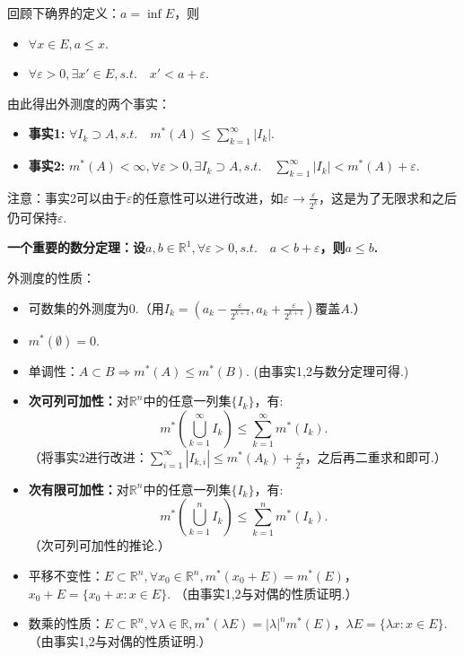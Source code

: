 \documentclass[bwprint, withoutpreface]{cumcmthesis}
\begin{document}
回顾下确界的定义：$a = \inf E$，则
\begin{itemize}[itemindent=2em]
	\item $\forall x \in E, a \leqslant x$.
	\item $\forall \varepsilon > 0, \exists x' \in E, s.t. \quad x' < a + \varepsilon$.
\end{itemize}

由此得出外测度的两个事实：
\begin{itemize}[itemindent=2em]
	\item \textbf{事实1:} $\forall {I_k} \supset A, s.t. \quad m^*(A) \leqslant \sum_{k = 1}^{\infty}|I_k|$.
	\item \textbf{事实2:} $m^*(A) < \infty, \forall \varepsilon > 0, \exists {I_k} \supset A, s.t. \quad \sum_{k = 1}^{\infty}|I_k| < m^*(A) + \varepsilon$.
\end{itemize}

注意：事实2可以由于$\varepsilon$的任意性可以进行改进，如$\varepsilon \to \frac{\varepsilon}{2^k}$，这是为了无限求和之后仍可保持$\varepsilon$.

\textbf{一个重要的数分定理：设$a, b \in \mathbb{R}^1, \forall \varepsilon > 0, s.t. \quad a < b + \varepsilon$，则$a \leqslant b$.}

外测度的性质：
\begin{itemize}[itemindent=2em]
	\item 可数集的外测度为$0$.（用$I_k = (a_k - \frac{\varepsilon}{2^{k + 1}}, a_k + \frac{\varepsilon}{2^{k + 1}})$覆盖$A$.）
	\item $m^*(\emptyset) = 0$.
	\item 单调性：$A \subset B \Rightarrow m^*(A) \leqslant m^*(B)$. (由事实1,2与数分定理可得.)
	\item \textbf{次可列可加性：}对$\mathbb{R}^n$中的任意一列集$\{I_k\}$，有:
	\begin{equation*}
		m^*(\bigcup_{k = 1}^{\infty}{I_k}) \leqslant \sum_{k = 1}^{\infty}{m^*(I_k)}.
	\end{equation*}（将事实2进行改进：$\sum_{i = 1}^{\infty}|I_{k, i}| \leqslant m^*(A_k) + \frac{\varepsilon}{2^k}$，之后再二重求和即可.）
	\item \textbf{次有限可加性：}对$\mathbb{R}^n$中的任意一列集$\{I_k\}$，有:
	\begin{equation*}
		m^*(\bigcup_{k = 1}^{n}{I_k}) \leqslant \sum_{k = 1}^{n}{m^*(I_k)}.
	\end{equation*}（次可列可加性的推论.）
	\item 平移不变性：$E \subset \mathbb{R}^n, \forall x_0 \in \mathbb{R}^n, m^*(x_0 + E) = m^*(E)$，$x_0 + E = \{x_0 + x: x \in E\}.$ （由事实1,2与对偶的性质证明.）
	\item 数乘的性质：$E \subset \mathbb{R}^n, \forall \lambda \in \mathbb{R}, m^*(\lambda E) = |\lambda|^n m^*(E)$，$\lambda E = \{\lambda x: x \in E\}.$ （由事实1,2与对偶的性质证明.）
\end{itemize}
\end{document}
